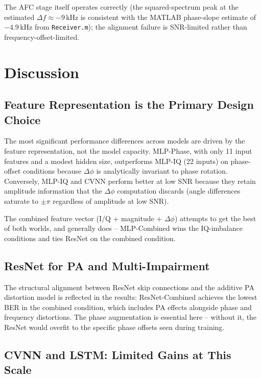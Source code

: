 \documentclass[journal]{IEEEtran}
\begin{document}
The AFC stage itself operates correctly (the squared-spectrum peak at the estimated
$\Delta f \approx -9\,\text{kHz}$ is consistent with the MATLAB phase-slope
estimate of $-4.9\,\text{kHz}$ from \texttt{Receiver.m}); the alignment failure is
SNR-limited rather than frequency-offset-limited.

\section{Discussion}
\label{sec:discussion}

\subsection{Feature Representation is the Primary Design Choice}

The most significant performance differences across models are driven by the
feature representation, not the model capacity. MLP-Phase, with only 11 input
features and a modest hidden size, outperforms MLP-IQ (22 inputs) on phase-offset
conditions because $\Delta\phi$ is analytically invariant to phase rotation.
Conversely, MLP-IQ and CVNN perform better at low SNR because they retain
amplitude information that the $\Delta\phi$ computation discards (angle differences
saturate to $\pm\pi$ regardless of amplitude at low SNR).

The combined feature vector (I/Q + magnitude + $\Delta\phi$) attempts to get the
best of both worlds, and generally does -- MLP-Combined wins the IQ-imbalance
conditions and ties ResNet on the combined condition.

\subsection{ResNet for PA and Multi-Impairment}

The structural alignment between ResNet skip connections and the additive PA
distortion model \cite{pihlajasalo2023deep} is reflected in the results: ResNet-Combined
achieves the lowest BER in the combined condition, which includes PA effects alongside
phase and frequency distortions. The phase augmentation is essential here -- without
it, the ResNet would overfit to the specific phase offsets seen during training.

\subsection{CVNN and LSTM: Limited Gains at This Scale}
\end{document}
